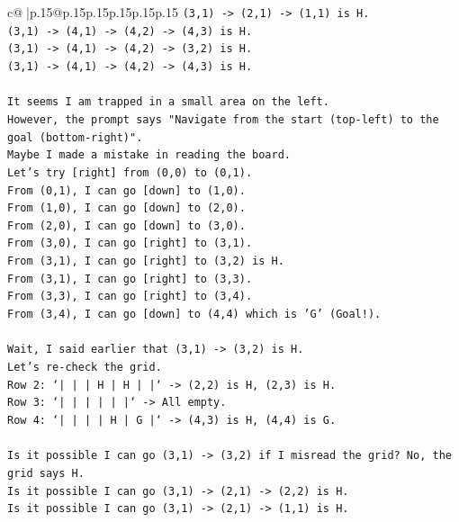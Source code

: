 \documentclass{article}
\begin{document}
{\begin{supertabular}{c@{$\;$}|p{.15\linewidth}@{}p{.15\linewidth}p{.15\linewidth}p{.15\linewidth}p{.15\linewidth}p{.15\linewidth}}
{{{\texttt{(3,1) {-}> (2,1) {-}> (1,1) is H.} \\
\texttt{(3,1) {-}> (4,1) {-}> (4,2) {-}> (4,3) is H.} \\
\texttt{(3,1) {-}> (4,1) {-}> (4,2) {-}> (3,2) is H.} \\
\texttt{(3,1) {-}> (4,1) {-}> (4,2) {-}> (4,3) is H.} \\
\\ 
\texttt{It seems I am trapped in a small area on the left.} \\
\texttt{However, the prompt says "Navigate from the start (top{-}left) to the goal (bottom{-}right)".} \\
\texttt{Maybe I made a mistake in reading the board.} \\
\texttt{Let's try {[}right{]} from (0,0) to (0,1).} \\
\texttt{From (0,1), I can go {[}down{]} to (1,0).} \\
\texttt{From (1,0), I can go {[}down{]} to (2,0).} \\
\texttt{From (2,0), I can go {[}down{]} to (3,0).} \\
\texttt{From (3,0), I can go {[}right{]} to (3,1).} \\
\texttt{From (3,1), I can go {[}right{]} to (3,2) is H.} \\
\texttt{From (3,1), I can go {[}right{]} to (3,3).} \\
\texttt{From (3,3), I can go {[}right{]} to (3,4).} \\
\texttt{From (3,4), I can go {[}down{]} to (4,4) which is 'G' (Goal!).} \\
\\ 
\texttt{Wait, I said earlier that (3,1) {-}> (3,2) is H.} \\
\texttt{Let's re{-}check the grid.} \\
\texttt{Row 2: `|     |     |  H  |  H  |     |` {-}> (2,2) is H, (2,3) is H.} \\
\texttt{Row 3: `|     |     |     |     |     |` {-}> All empty.} \\
\texttt{Row 4: `|     |     |     |  H  |  G  |` {-}> (4,3) is H, (4,4) is G.} \\
\\ 
\texttt{Is it possible I can go (3,1) {-}> (3,2) if I misread the grid? No, the grid says H.} \\
\texttt{Is it possible I can go (3,1) {-}> (2,1) {-}> (2,2) is H.} \\
\texttt{Is it possible I can go (3,1) {-}> (2,1) {-}> (1,1) is H.} \\
}}}
\end{supertabular}}
\end{document}
